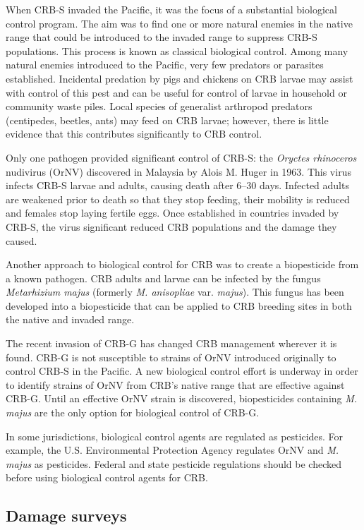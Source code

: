 \documentclass[twocolumn,letterpaper]{scrartcl}
\begin{document}
When CRB-S invaded the Pacific, it was the focus of a substantial biological control  program.  The  aim was to find one or more natural enemies in the native range that could be introduced to the invaded range to  suppress  CRB-S  populations.  This  process  is  known  as  classical  biological  control. Among many natural enemies introduced to the Pacific, very few predators or parasites established. Incidental predation by pigs and chickens on CRB larvae may assist with control of this pest and can be useful for control of larvae in household or community waste piles. Local species of generalist arthropod predators (centipedes, beetles, ants) may feed on CRB larvae; however, there is 
little evidence that this contributes significantly to CRB control. 

Only one pathogen provided significant control of CRB-S: the \textit{Oryctes rhinoceros} nudivirus (OrNV) discovered in Malaysia by Alois M. Huger in 1963. This virus infects CRB-S larvae and adults, causing death after 6–30 days. Infected adults are weakened prior to death so that they stop feeding, their mobility is reduced and females stop laying fertile eggs. Once established in countries invaded by CRB-S, the virus significant reduced CRB populations and the damage they caused. 

Another approach to biological control for CRB was to create a biopesticide from a known pathogen. CRB adults and larvae can be infected by the fungus \textit{Metarhizium majus} (formerly \textit{M. anisopliae} var. \textit{majus}). This fungus has been developed into 
a biopesticide that can be applied to CRB breeding sites in both the native and invaded range. 

The recent invasion of CRB-G has changed CRB management wherever it is found. CRB-G is not susceptible to strains of OrNV introduced originally to control CRB-S in the Pacific. A new biological control effort is underway in order to identify strains of OrNV from CRB’s native range that are effective against CRB-G. Until an effective OrNV strain is discovered, biopesticides containing \textit{M. majus} are the only option for biological control of CRB-G.

In some jurisdictions, biological control agents are regulated as pesticides. For example, the U.S. Environmental Protection Agency regulates OrNV and \textit{M. majus} as pesticides. Federal and state pesticide regulations should be checked before using biological control agents for CRB. 

\newpage
\subsection{Damage surveys}
\end{document}
